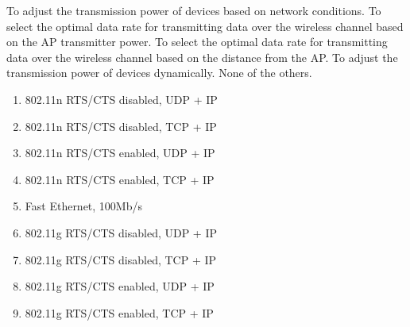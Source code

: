 \begin{questions}







    \begin{checkboxes}
        \choice To adjust the transmission power of devices based on network conditions.
        \choice To select the optimal data rate for transmitting data over the wireless channel based on the AP transmitter power.
        \choice To select the optimal data rate for transmitting data over the wireless channel based on the distance from the AP.
        \choice To adjust the transmission power of devices dynamically.
        \CorrectChoice None of the others.
    \end{checkboxes}

    \begin{solution}
        \begin{enumerate}
            \item 802.11n RTS/CTS disabled, UDP + IP
            \item 802.11n RTS/CTS disabled, TCP + IP
            \item 802.11n RTS/CTS enabled, UDP + IP
            \item 802.11n RTS/CTS enabled, TCP + IP
            \item Fast Ethernet, 100Mb/s
            \item 802.11g RTS/CTS disabled, UDP + IP
            \item 802.11g RTS/CTS disabled, TCP + IP
            \item 802.11g RTS/CTS enabled, UDP + IP
            \item 802.11g RTS/CTS enabled, TCP + IP
        \end{enumerate}
    \end{solution}



\end{questions}
